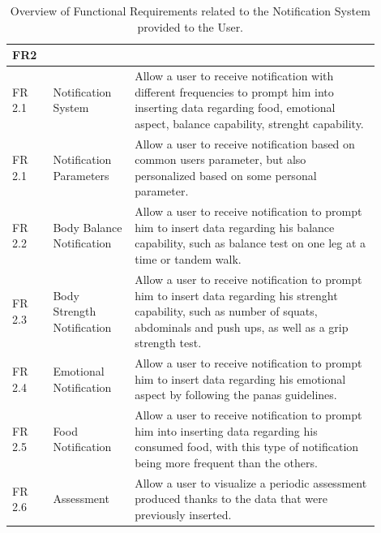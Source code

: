 \begin{table}[h!]
    \setstretch{\myspacing}
    \centering
    \begin{tabular}{|>{\raggedright\arraybackslash}p{0.1\linewidth}|>{\raggedright\arraybackslash}p{0.2\linewidth}|>{\raggedright\arraybackslash}p{0.6\linewidth}|}
        \hline
        \textbf{FR2} & \multicolumn{2}{>{\centering\arraybackslash}p{0.7\linewidth}|}{\textbf{Notification System}} \\
        \hline
        FR 2.1 & Notification System & Allow a user to receive notification with different frequencies to prompt him into inserting data regarding food, emotional aspect, balance capability, strenght capability. \\
        \hline
        FR 2.1 & Notification Parameters & Allow a user to receive notification based on common users parameter, but also personalized based on some personal parameter. \\
        \hline
        FR 2.2 & Body Balance Notification & Allow a user to receive notification to prompt him to insert data regarding his balance capability, such as balance test on one leg at a time or tandem walk. \\
        \hline
        FR 2.3 & Body Strength Notification & Allow a user to receive notification to prompt him to insert data regarding his strenght capability, such as number of squats, abdominals and push ups, as well as a grip strength test. \\
        \hline
        FR 2.4 & Emotional Notification & Allow a user to receive notification to prompt him to insert data regarding his emotional aspect by following the panas guidelines. \\
        \hline
        FR 2.5 & Food Notification & Allow a user to receive notification to prompt him into inserting data regarding his consumed food, with this type of notification being more frequent than the others. \\
        \hline
        FR 2.6 & Assessment & Allow a user to visualize a periodic assessment produced thanks to the data that were previously inserted. \\
        \hline
    \end{tabular}
    \caption{Overview of Functional Requirements related to the Notification System provided to the User.}
\end{table}

